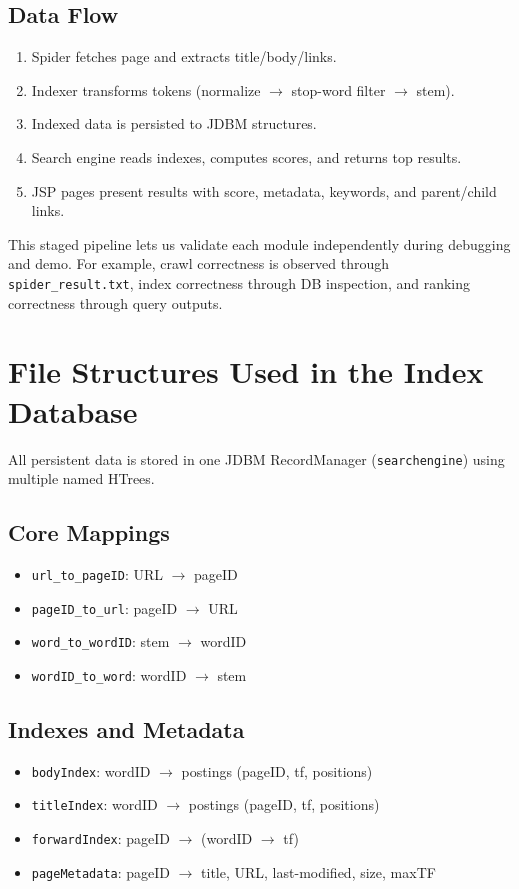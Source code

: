 \documentclass[11pt,a4paper]{article}
\begin{document}
\subsection{Data Flow}
\begin{enumerate}[leftmargin=1.5em]
  \item Spider fetches page and extracts title/body/links.
  \item Indexer transforms tokens (normalize $\rightarrow$ stop-word filter $\rightarrow$ stem).
  \item Indexed data is persisted to JDBM structures.
  \item Search engine reads indexes, computes scores, and returns top results.
  \item JSP pages present results with score, metadata, keywords, and parent/child links.
\end{enumerate}
This staged pipeline lets us validate each module independently during debugging and demo.
For example, crawl correctness is observed through \texttt{spider\_result.txt}, index
correctness through DB inspection, and ranking correctness through query outputs.

\section{File Structures Used in the Index Database}

All persistent data is stored in one JDBM RecordManager (\texttt{searchengine}) using multiple named HTrees.

\subsection{Core Mappings}
\begin{itemize}[leftmargin=1.5em]
  \item \texttt{url\_to\_pageID}: URL $\rightarrow$ pageID
  \item \texttt{pageID\_to\_url}: pageID $\rightarrow$ URL
  \item \texttt{word\_to\_wordID}: stem $\rightarrow$ wordID
  \item \texttt{wordID\_to\_word}: wordID $\rightarrow$ stem
\end{itemize}

\subsection{Indexes and Metadata}
\begin{itemize}[leftmargin=1.5em]
  \item \texttt{bodyIndex}: wordID $\rightarrow$ postings (pageID, tf, positions)
  \item \texttt{titleIndex}: wordID $\rightarrow$ postings (pageID, tf, positions)
  \item \texttt{forwardIndex}: pageID $\rightarrow$ (wordID $\rightarrow$ tf)
  \item \texttt{pageMetadata}: pageID $\rightarrow$ title, URL, last-modified, size, maxTF
\end{itemize}
\end{document}
